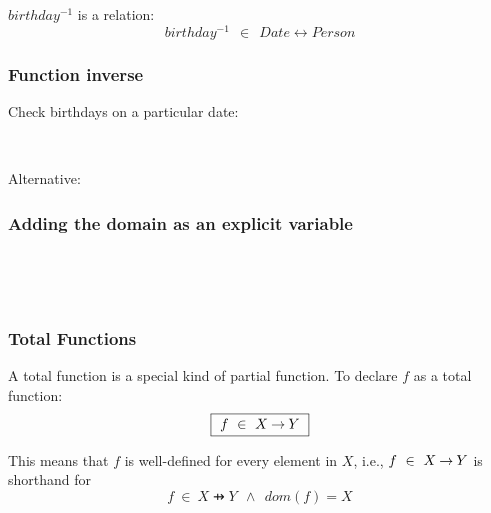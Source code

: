 \documentclass{beamer}
\begin{document}
\begin{frame}

$ birthday^{-1}$ is a relation:
\[
birthday^{-1} ~~\in~~ Date \rel Person
\]


\frametitle{Function inverse}

Check birthdays on a particular date:


~

Alternative:



\end{frame}





\begin{frame}


\frametitle{Adding the domain as an explicit variable}


~

%

~


\end{frame}





\begin{frame}

\frametitle{Total Functions}

A total function is a special kind of partial function.
 To declare $f$ as a total function:
\[
    \mbox{\fbox{$~f ~\in~ X \mathbin\rightarrow Y~$}}
\]

This means that $f$ is well-defined for every element in $X$,
i.e., $f ~\in~ X\mathbin\rightarrow Y$  is shorthand for
\[
    f ~\in~ X\pfun Y  ~~\land~~ dom(f) = X
\]


\end{frame}
\end{document}
